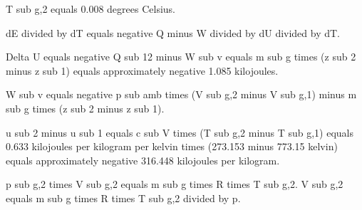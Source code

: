 T sub g,2 equals 0.008 degrees Celsius.  

dE divided by dT equals negative Q minus W divided by dU divided by dT.  

Delta U equals negative Q sub 12 minus W sub v equals m sub g times (z sub 2 minus z sub 1) equals approximately negative 1.085 kilojoules.  

W sub v equals negative p sub amb times (V sub g,2 minus V sub g,1) minus m sub g times (z sub 2 minus z sub 1).  

u sub 2 minus u sub 1 equals c sub V times (T sub g,2 minus T sub g,1) equals 0.633 kilojoules per kilogram per kelvin times (273.153 minus 773.15 kelvin) equals approximately negative 316.448 kilojoules per kilogram.  

p sub g,2 times V sub g,2 equals m sub g times R times T sub g,2.  
V sub g,2 equals m sub g times R times T sub g,2 divided by p.